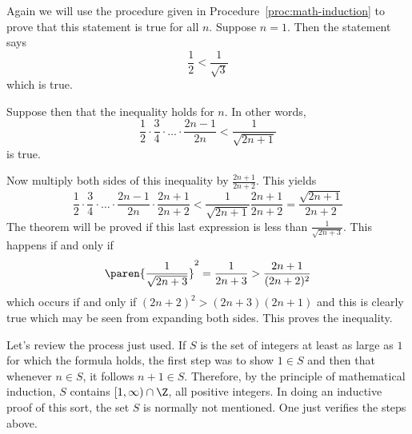\begin{solution}
Again we will use the procedure given in Procedure~\ref{proc:math-induction} to prove that this statement is true for all $n$.
Suppose $n=1$. Then the statement says
\begin{equation*}
\frac{1}{2}< \frac{1}{\sqrt{3}}
\end{equation*}
 which is true.

Suppose then that
the inequality holds for $n$. In other words,
\begin{equation*}
 \frac{1}{2}\cdot \frac{3}{4}\cdot\ldots\cdot \frac{2n-1}{2n} < \frac{1}{\sqrt{2n+1}}
\end{equation*}
is true.

Now multiply both sides of this inequality by $\frac{2n+1}{2n+2}$.
This yields
\begin{equation*}
\frac{1}{2}\cdot \frac{3}{4}\cdot\ldots\cdot \frac{2n-1}{2n}\cdot \frac{2n+1}{2n+2}<
\frac{1}{\sqrt{2n+1}}\frac{2n+1}{2n+2}=\frac{\sqrt{2n+1}}{2n+2}
\end{equation*}
The theorem will be proved if this last expression is less than $
\displaystyle\frac{1}{\sqrt{2n+3}}$. This happens if and only if
\begin{equation*}
\paren{\frac{1}{\sqrt{2n+3}}} ^{2}=\frac{1}{2n+3}>\frac{2n+1}{(
2n+2) ^{2}}
\end{equation*}
which occurs if and only if $(2n+2) ^{2}>(2n+3)
(2n+1) $ and this is clearly true which may be seen from
expanding both sides. This proves the inequality.
\end{solution}

Let's review the process just used. If $S$ is the set of integers at least as
large as $1$ for which the formula holds, the first step was to show $1\in S$
and then that whenever $n\in S$, it follows $n+1\in S$. Therefore, by the
principle of mathematical induction, $S$ contains $[1,\infty )\cap \Z
$, all positive integers. In doing an inductive proof of this sort, the set $
S$ is normally not mentioned. One just verifies the steps above.
